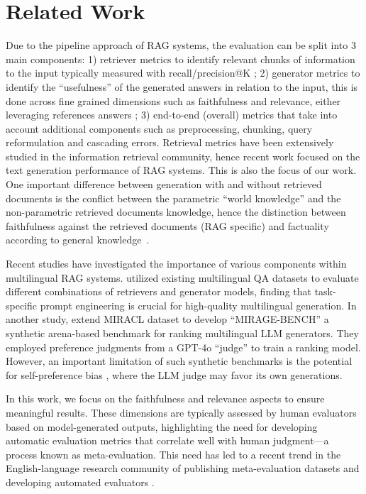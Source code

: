 \section{Related Work}
Due to the pipeline approach of RAG systems, the evaluation can be split into 3 main components: 1) retriever metrics to identify relevant chunks of information to the input typically measured with recall/precision@K \cite{manning2008ir}; 2) generator metrics to identify the “usefulness” of the generated answers in relation to the input, this is done across fine grained dimensions such as faithfulness and relevance, either leveraging references answers \cite{es-etal-2024-ragas}; 3) end-to-end (overall) metrics that take into account additional components such as preprocessing, chunking, query reformulation and cascading errors. Retrieval metrics have been extensively studied in the information retrieval community, hence recent work focused on the text generation performance of RAG systems. This is also the focus of our work. One important difference between generation with and without retrieved documents is the conflict between the parametric “world knowledge” and the non-parametric retrieved documents knowledge, hence the distinction between faithfulness against the retrieved documents (RAG specific) and factuality according to general knowledge~\cite{maynez-etal-2020-faithfulness, wu2024clasheval}.


Recent studies have investigated the importance of various components within multilingual RAG systems. \cite{chirkova2024s} utilized existing multilingual QA datasets to evaluate different combinations of retrievers and generator models, finding that task-specific prompt engineering is crucial for high-quality multilingual generation. In another study, \cite{mirage_bench} extend MIRACL dataset to develop ``MIRAGE-BENCH'' a synthetic arena-based benchmark for ranking multilingual LLM generators. They employed preference judgments from a GPT-4o ``judge'' to train a ranking model. However, an important limitation of such synthetic benchmarks is the potential for self-preference bias \cite{self_preference_bias}, where the LLM judge may favor its own generations.

In this work, we focus on the faithfulness and relevance aspects to ensure meaningful results. These dimensions are typically assessed by human evaluators based on model-generated outputs, highlighting the need for developing automatic evaluation metrics that correlate well with human judgment—a process known as meta-evaluation. This need has led to a recent trend in the English-language research community of publishing meta-evaluation datasets and developing automated evaluators \cite{es-etal-2024-ragas, saad-falcon_ares_2024}.

